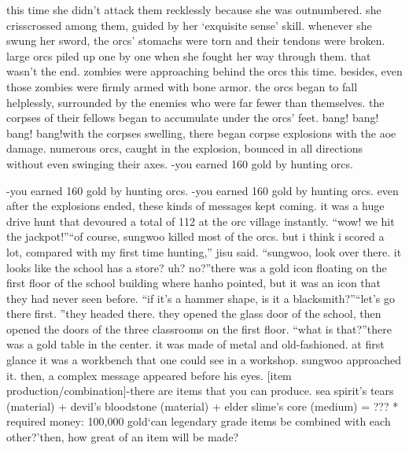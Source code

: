  this time she didn’t attack them recklessly because she was outnumbered.
she crisscrossed among them, guided by her ‘exquisite sense’ skill.
whenever she swung her sword, the orcs’ stomachs were torn and their tendons were broken.
 large orcs piled up one by one when she fought her way through them.
that wasn’t the end.
zombies were approaching behind the orcs this time.
 besides, even those zombies were firmly armed with bone armor.
the orcs began to fall helplessly, surrounded by the enemies who were far fewer than themselves.
the corpses of their fellows began to accumulate under the orcs’ feet.
bang! bang! bang! bang!with the corpses swelling, there began corpse explosions with the aoe damage.
 numerous orcs, caught in the explosion, bounced in all directions without even swinging their axes.
-you earned 160 gold by hunting orcs.


-you earned 160 gold by hunting orcs.
-you earned 160 gold by hunting orcs.
even after the explosions ended, these kinds of messages kept coming.
it was a huge drive hunt that devoured a total of 112 at the orc village instantly.
“wow! we hit the jackpot!”“of course, sungwoo killed most of the orcs.
 but i think i scored a lot, compared with my first time hunting,” jisu said.
“sungwoo, look over there.
 it looks like the school has a store? uh? no?”there was a gold icon floating on the first floor of the school building where hanho pointed, but it was an icon that they had never seen before.
“if it’s a hammer shape, is it a blacksmith?”“let’s go there first.
”they headed there.
 they opened the glass door of the school, then opened the doors of the three classrooms on the first floor.
“what is that?”there was a gold table in the center.
 it was made of metal and old-fashioned.
 at first glance it was a workbench that one could see in a workshop.
sungwoo approached it.
 then, a complex message appeared before his eyes.
[item production/combination]-there are items that you can produce.
sea spirit’s tears (material) + devil’s bloodstone (material) + elder slime’s core (medium) = ??? * required money: 100,000 gold‘can legendary grade items be combined with each other?’then, how great of an item will be made?

 